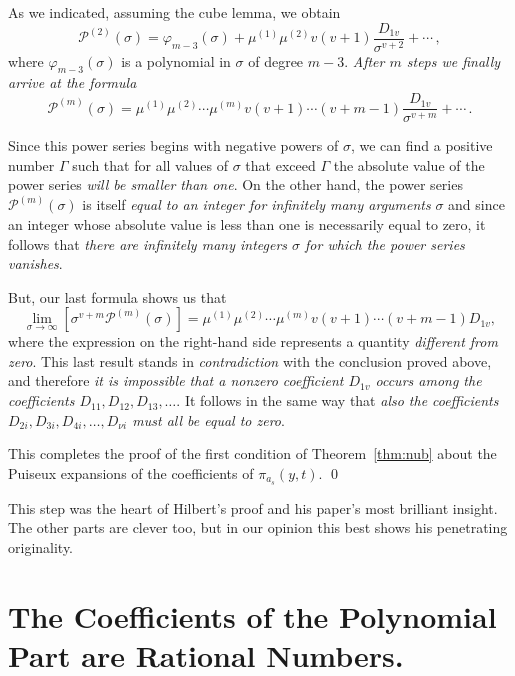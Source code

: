 \documentclass{article}
\theoremstyle{plain}
\theoremstyle{definition}
\begin{document}
As we indicated, assuming the cube lemma, we obtain
\[
\mathcal{P}^{(2)}(\sigma) = \varphi_{m-3}(\sigma) 
+ \mu^{(1)}\mu^{(2)}v(v + 1) \frac{D_{1v}}{\sigma^{v+2}} + \cdots \,,
\]
where $\varphi_{m-3}(\sigma)$ is a polynomial in $\sigma$ of degree
$m - 3$. \emph{After $m$ steps we finally arrive at the formula}
\[
\mathcal{P}^{(m)}(\sigma) 
= \mu^{(1)} \mu^{(2)} \cdots \mu^{(m)} v(v + 1) \cdots
(v + m - 1) \frac{D_{1v}}{\sigma^{v+m}} + \cdots \,.
\]

Since this power series begins with negative powers of $\sigma$, we
can find a positive number $\Gamma$ such that for all values of
$\sigma$ that exceed $\Gamma$ the absolute value of the power series
\emph{will be smaller than one}. On the other hand, the power series
$\mathcal{P}^{(m)}(\sigma)$ is itself \emph{equal to an integer for
infinitely many arguments} $\sigma$ and since an integer whose
absolute value is less than one is necessarily equal to zero, it
follows that \emph{there are infinitely many integers $\sigma$ for
which the power series vanishes}.

But, our last formula shows us that 
\[
\lim_{\sigma\to\infty}
\left[ \sigma^{v+m}\mathcal{P}^{(m)}(\sigma) \right]
= \mu^{(1)} \mu^{(2)} \cdots \mu^{(m)} v(v + 1) \cdots
(v + m - 1) D_{1v},
\]
where the expression on the right-hand side represents a quantity
\emph{different from zero}. This last result stands in
\emph{contradiction} with the conclusion proved above, and therefore
\emph{it is impossible that a nonzero coefficient $D_{1v}$ occurs
among the coefficients $D_{11},D_{12},D_{13},\dots$}. It follows in
the same way that \emph{also the coefficients
$D_{2i},D_{3i},D_{4i},\dots,D_{\nu i}$ must all be equal to zero}.

This completes the proof of the first condition of Theorem~\ref{thm:nub} about the Puiseux
expansions of the coefficients of $\pi_{a_s}(y,t)$.
\qed

\medskip

This step was the heart of Hilbert's proof and his paper's most
brilliant insight. The other parts are clever too, but in our opinion
this best shows his penetrating originality.



\section{The Coefficients of the Polynomial Part are Rational Numbers.}
\label{sec:rat}
\end{document}
